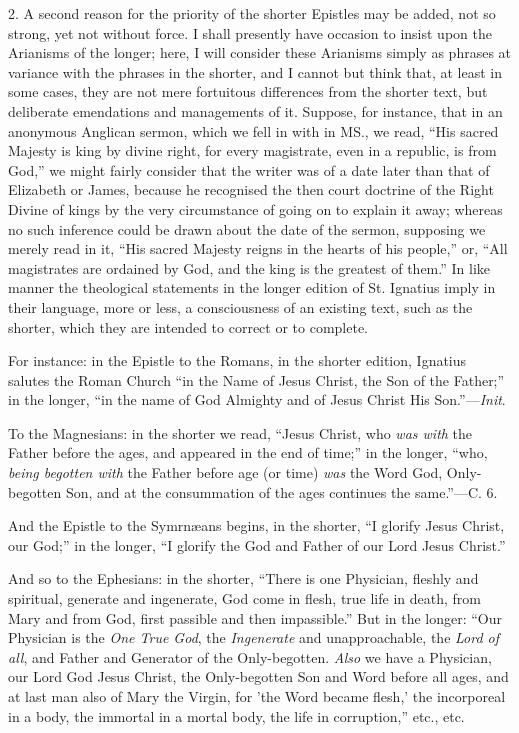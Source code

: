 2. A second reason for the
priority of the shorter Epistles may be added, not so strong, yet not
without force. I shall presently have occasion to insist upon the
Arianisms of the longer; here, I will consider these Arianisms simply
as phrases at variance with the phrases in the shorter, and I cannot
but think that, at least in some cases, they are not mere fortuitous
differences from the shorter text, but deliberate emendations and
managements of it. Suppose, for instance, that in an anonymous
Anglican sermon, which we fell in with in MS., we read, ``His sacred
Majesty is king by divine right, for every magistrate, even in a
republic, is from God,'' we might fairly consider that the writer was
of a date later than that of Elizabeth or James, because he recognised
the then court doctrine of the Right Divine of kings by the very
circumstance of going on to explain it away; whereas no such
inference could be drawn about the date of the sermon, supposing we
merely read in it, ``His sacred Majesty reigns in the hearts of his
people,'' or, ``All magistrates are ordained by God, and the king is the
greatest of them.'' In like manner the theological statements in the
longer edition of St. Ignatius imply in their language, more or less,
a consciousness of an existing text, such as the shorter, which they
are intended to correct or to complete.

For instance: in the Epistle
to the Romans, in the shorter edition, Ignatius salutes the Roman
Church ``in the Name of Jesus Christ, the Son of the Father;'' in the
longer, ``in the name of God Almighty and of Jesus Christ His Son.''—\emph{Init}.

To the Magnesians: in the
shorter we read, ``Jesus Christ, who \emph{was with} the Father before
the ages, and appeared in the end of time;'' in the longer, ``who, \emph{being
begotten with} the Father before age (or time) \emph{was} the Word
God, Only-begotten Son, and at the consummation of the ages continues
the same.''—C. 6.

And the Epistle to the Symrnæans
begins, in the shorter, ``I glorify Jesus Christ, our God;'' in the
longer, ``I glorify the God and Father of our Lord Jesus Christ.''

And so to the Ephesians: in
the shorter, ``There is one Physician, fleshly and spiritual, generate
and ingenerate, God come in flesh, true life in death, from Mary and
from God, first passible and then impassible.'' But in the longer: ``Our
Physician is the \emph{One True God}, the \emph{Ingenerate} and
unapproachable, the \emph{Lord of all}, and Father and Generator
of the Only-begotten. \emph{Also} we have a Physician, our Lord God
Jesus Christ, the Only-begotten Son and Word before all ages, and at
last man also of Mary the Virgin, for 'the Word became flesh,' the
incorporeal in a body, the immortal in a mortal body, the life in
corruption,'' etc., etc.

